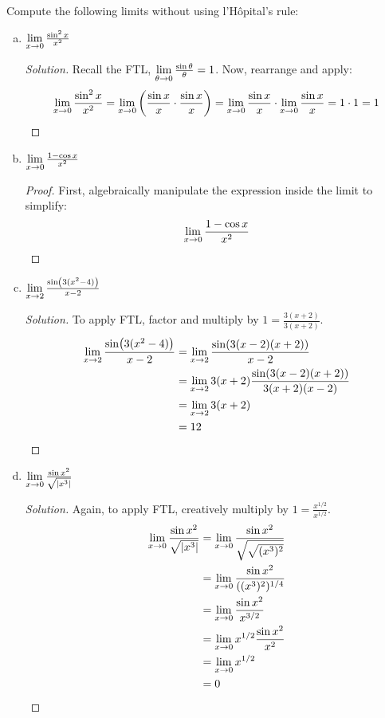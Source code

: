 \documentclass{agony}
\begin{document}
\question Compute the following limits without using l'H\^{o}pital's rule:
\begin{enumerate}[(a)]
  \item $\lim\limits_{x\to0} \frac{\sin^2 x}{x^2}$
        \begin{proof}[Solution]
          Recall the FTL, $\lim\limits_{\theta\to0} \frac{\sin\theta}{\theta} = 1$.
          Now, rearrange and apply:
          \begin{equation*}
            \lim\limits_{x\to0} \frac{\sin^2 x}{x^2}
            = \lim\limits_{x\to0}\left(\frac{\sin x}{x}\cdot\frac{\sin x}{x}\right)
            = \lim\limits_{x\to0}\frac{\sin x}{x} \cdot \lim\limits_{x\to0}\frac{\sin x}{x}
            = 1 \cdot 1
            = 1 \qedhere
          \end{equation*}
        \end{proof}
  \item $\lim\limits_{x\to0} \frac{1-\cos x}{x^2}$
        \begin{proof}
          First, algebraically manipulate the expression inside the limit to simplify:
          \begin{equation*}
            \lim\limits_{x\to0} \frac{1-\cos x}{x^2}
          \end{equation*}
        \end{proof}
  \item $\lim\limits_{x\to2} \frac{\sin(3(x^2-4))}{x-2}$
        \begin{proof}[Solution]
          To apply FTL, factor and multiply by $1=\frac{3(x+2)}{3(x+2)}$.
          \begin{align*}
            \lim\limits_{x\to2} \frac{\sin(3(x^2-4))}{x-2}
             & = \lim\limits_{x\to2} \frac{\sin(3(x-2)(x+2))}{x-2}               \\
             & = \lim\limits_{x\to2} 3(x+2)\frac{\sin(3(x-2)(x+2))}{3(x+2)(x-2)} \\
             & = \lim\limits_{x\to2} 3(x+2)                                      \\
             & = 12 \qedhere
          \end{align*}
        \end{proof}
  \item $\lim\limits_{x\to0} \frac{\sin x^2}{\sqrt{|x^3|}}$
        \begin{proof}[Solution]
          Again, to apply FTL, creatively multiply by $1=\frac{x^{1/2}}{x^{1/2}}$.
          \begin{align*}
            \lim\limits_{x\to0} \frac{\sin x^2}{\sqrt{|x^3|}}
             & = \lim\limits_{x\to0} \frac{\sin x^2}{\sqrt{\sqrt{(x^3)^2}}} \\
             & = \lim\limits_{x\to0} \frac{\sin x^2}{((x^3)^2)^{1/4}}       \\
             & = \lim\limits_{x\to0} \frac{\sin x^2}{x^{3/2}}               \\
             & = \lim\limits_{x\to0} x^{1/2}\frac{\sin x^2}{x^2}            \\
             & = \lim\limits_{x\to0} x^{1/2}                                \\
             & = 0 \qedhere                                         \\
          \end{align*}
        \end{proof}
\end{enumerate}
\end{document}
